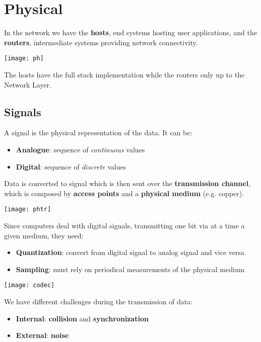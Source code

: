 \newpage
\section{Physical}
In the network we have the \textbf{hosts}, end systems hosting user applications, and the \textbf{routers}, intermediate systems providing network connectivity.
\begin{center}
	\texttt{[image: ph]}
\end{center}
The hosts have the full stack implementation while the routers only up to the Network Layer.
\subsection{Signals}
\begin{definition}[Signal]
	A signal is the physical representation of the data. It can be:
	\begin{itemize}
		\item \textbf{Analogue}: sequence of \textit{continuous} values
		\item \textbf{Digital}: sequence of \textit{discrete} values
	\end{itemize}
\end{definition}

Data is converted to signal which is then sent over the \textbf{transmission channel}, which is composed by \textbf{access points} and a \textbf{physical medium} (e.g. copper).
\begin{center}
	\texttt{[image: phtr]}
\end{center}
Since computers deal with digital signals, transmitting one bit via at a time a given medium, they need:
\begin{itemize}
	\item \textbf{Quantization}: convert from digital signal to analog signal and vice versa
	\item \textbf{Sampling}: must rely on periodical measurements of the physical medium
\end{itemize}
\begin{center}
	\texttt{[image: codec]}
\end{center}

\begin{observation}
	We have different challenges during the transmission of data:
	\begin{itemize}
		\item \textbf{Internal}: \textbf{collision} and \textbf{synchronization}
		\item \textbf{External}: \textbf{noise}
	\end{itemize}
\end{observation}

